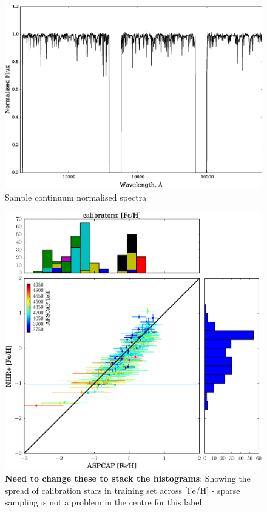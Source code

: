 \documentclass[12pt, preprint]{aastex}
\begin{document}
\begin{figure}[h!]
  \includegraphics[width=\hsize]{./plots/normed_300.eps}
\caption{Sample continuum normalised spectra}
\label{fig:DNA}
\end{figure}

\begin{figure}[h!]
  \includegraphics[width=\hsize]{./plots/cal_feh.eps}
\caption{\textbf{Need to change these to stack the histograms}: Showing the spread of calibration stars in training set across [Fe/H] - sparse sampling is not a problem in the centre for this label}
\label{fig:cal_feh}
\end{figure}
\end{document}
